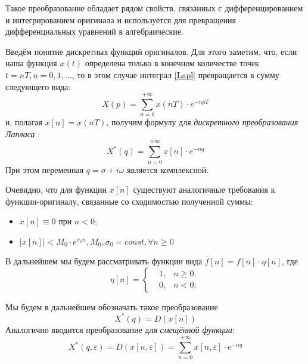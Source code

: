 \documentclass[12pt,twoside]{report}
\theoremstyle{MyNonumberplain}
\begin{document}
        Такое преобразование обладает рядом свойств, связанных с дифференцированием и интегрированием оригинала и используется
        для превращения дифференциальных уравнений в алгебраические.

        Введём понятие дискретных функций оригиналов. Для этого заметим, что, если наша функция $x(t)$ определена только в 
        конечном количестве точек $t=nT, n=0,1,\dots$, то в этом случае интеграл \eqref{Lapl} превращается в сумму следующего вида:
        \begin{equation*}
            X(p)=\sum_{n=0}^{+\infty} x(nT) \cdot e^{-npT}
        \end{equation*}
        и, полагая $x[n]=x(nT)$, получим формулу для \textit{дискретного преобразования Лапласа} :
        \begin{equation}\label{DiskrD}
            X^*(q)=\sum_{n=0}^{+\infty} x[n] \cdot e^{-nq}
        \end{equation}
        При этом переменная $q = \sigma + i\omega$ является комплексной.
    
        Очевидно, что для функции  $x[n]$ существуют аналогичные требования к функции-оригиналу, связанные со сходимостью
        полученной суммы:
        \begin{itemize}
            \item $x[n] \equiv 0$ при $n < 0$;
            \item $|x[n]| < M_0\cdot e^{\sigma_0 n}, M_0,\sigma_0=const, \forall n \ge 0$
        \end{itemize}
        В дальнейшем мы будем рассматривать функции вида $\bar{f}[n] = f[n]\cdot\eta[n]$, где
        \begin{equation*}
            \eta[n]=\left\{
            \begin{split}
                &1, &n \geq 0,\\
                &0, &n < 0;
            \end{split}
            \right.
        \end{equation*}
        
        Мы будем в дальнейшем обозначать такое преобразование
        \begin{equation*}
            X^*(q) = D(x[n])
        \end{equation*}
        Аналогично вводится преобразование для \textit{смещённой функции}:
        \begin{equation*}
            X^*(q,\varepsilon) = D(x[n,\varepsilon])=\sum_{n=0}^{+\infty} x[n,\varepsilon] \cdot e^{-nq}
        \end{equation*}
    
\end{document}
